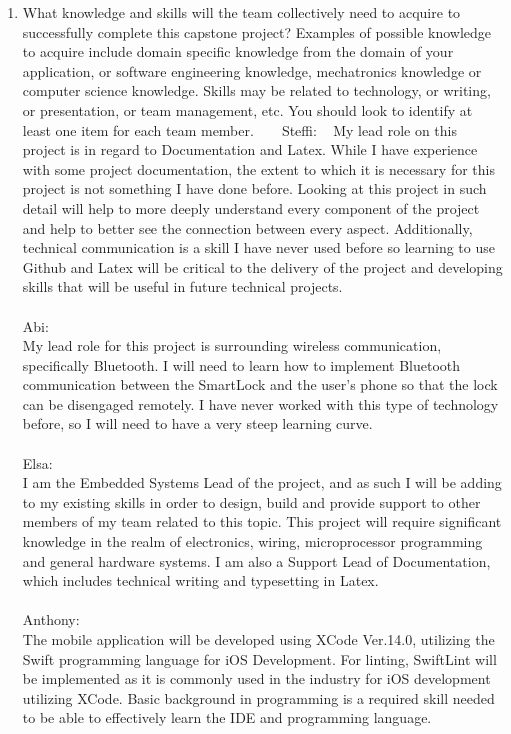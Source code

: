 \documentclass[12pt]{article}
\begin{document}
\begin{enumerate}
  \item What knowledge and skills will the team collectively need to acquire to
  successfully complete this capstone project?  Examples of possible knowledge
  to acquire include domain specific knowledge from the domain of your
  application, or software engineering knowledge, mechatronics knowledge or
  computer science knowledge.  Skills may be related to technology, or writing,
  or presentation, or team management, etc.  You should look to identify at
  least one item for each team member.
  ~\newline
  ~\newline
 Steffi: 
  ~\newline
My lead role on this project is in regard to Documentation and Latex.  While I have experience with some project documentation, the extent to which it is necessary for this project is not something I have done before.  Looking at this project in such detail will help to more deeply understand every component of the project and help to better see the connection between every aspect.  Additionally, technical communication is a skill I have never used before so learning to use Github and Latex will be critical to the delivery of the project and developing skills that will be useful in future technical projects.
\\
\\
Abi:
\\
My lead role for this project is surrounding wireless communication, specifically Bluetooth.  I will need to learn how to implement Bluetooth communication between the SmartLock and the user's phone so that the lock can be disengaged remotely.  I have never worked with this type of technology before, so I will need to have a very steep learning curve. 
 \\
\\
Elsa:
\\ 
 I am the Embedded Systems Lead of the project, and as such I will be adding to my existing skills in order to design, build and provide support to other members of my team related to this topic. This project will require significant knowledge in the realm of electronics, wiring, microprocessor programming and general hardware systems. I am also a Support Lead of Documentation, which includes technical writing and typesetting in Latex. 
 \\
 \\
 Anthony: 
 \\
 The mobile application will be developed using XCode Ver.14.0, utilizing the Swift programming language for iOS Development. For linting, SwiftLint will be implemented as it is commonly used in the industry for iOS development utilizing XCode. Basic background in programming is a required skill needed to be able to effectively learn the IDE and programming language.

\end{enumerate}
\end{document}
